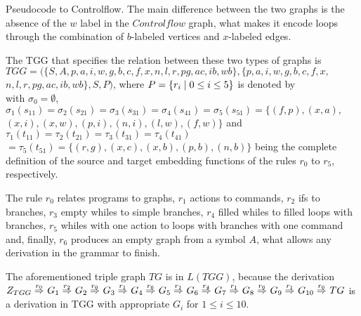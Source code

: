 \begin{example}{Pseudocode to Controlflow.}
	The main difference between the two graphs is the absence of the $w$ label in the $Controlflow$ graph, what makes it encode loops through the combination of $b$-labeled vertices and $x$-labeled edges.
	
	The TGG that specifies the relation between these two types of graphs is $TGG = (\{S, A, p, a, i, w, g, b, c, f, x, n, l, r, pg, ac, ib, wb\}, \{p, a, i, w, g, b, c, f, x,$ $ n, l, r, pg, ac, ib, wb\}, S, P)$, where $P = \{r_i \; | \; 0 \le i \le 5\}$ is denoted by\\
	
	
	\noindent
	with $\sigma_0 = \emptyset$, $\sigma_1(s_{11}) = \sigma_2(s_{21}) = \sigma_3(s_{31}) = \sigma_4(s_{41}) =\sigma_5(s_{51}) = \{ (f,p), (x,a), $ $(x,i), (x,w), (p,i), (n,i), (l,w), (f,w) \}$ and $\tau_1(t_{11}) = \tau_2(t_{21}) = \tau_3(t_{31}) = \tau_4(t_{41}) $ $= \tau_5(t_{51}) = \{ (r,g), (x,c), (x,b), (p,b), (n,b)\}$ being the complete definition of the source and target embedding functions of the rules $r_0$ to $r_5$, respectively.
	
	The rule $r_0$ relates programs to graphs, $r_1$ actions to commands, $r_2$ ifs to branches, $r_3$ empty whiles to simple branches, $r_4$ filled whiles to filled loops with branches, $r_5$ whiles with one action to loops with branches with one command and, finally, $r_6$ produces an empty graph from a symbol $A$, what allows any derivation in the grammar to finish.
	
	The aforementioned triple graph $TG$ is in $L(TGG)$, because the derivation
	$
	\startTG{TGG} \tderiv{r_0}{}{} G_1 \tderiv{r_2}{}{} G_2 \tderiv{r_6}{}{} G_3 \tderiv{r_1}{}{} G_4 \tderiv{r_6}{}{} G_5 \tderiv{r_1}{}{} G_6 \tderiv{r_4}{}{} G_7 \tderiv{r_1}{}{} G_8 \tderiv{r_6}{}{} G_9 \tderiv{r_1}{}{} G_{10} \tderiv{r_6}{}{} TG
	$
	is a derivation in TGG with appropriate $G_i$ for $1 \le i \le 10$.
\end{example}

